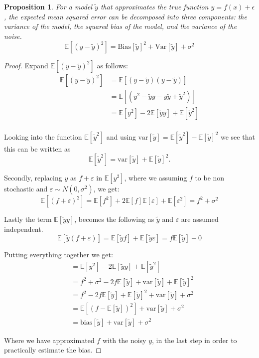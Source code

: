 \documentclass[twocolumn,aps]{revtex4}
\newtheorem{prop}{Proposition}[section]
\begin{document}
\begin{prop}
For a model $\tilde{y}$ that approximates the true function $y=f(x)+\epsilon$, the expected mean squared error can be decomposed into three components: the variance of the model, the squared bias of the model, and the variance of the noise.
$$\mathbb{E}[(y-\tilde{y})^2]=\mathrm{Bias}[\tilde{y}]^2+\mathrm{Var}[\tilde{y}]+\sigma^2$$
\label{prop:BiasVarianceDecomp}
\end{prop}

\begin{proof}

Expand $\mathbb{E}[(y-\tilde{y})^2]$ as follows:
\begin{align*}
\mathbb{E}[(y-\tilde{y})^2 ]&= \mathbb{E}[(y-\tilde{y}) (y-\tilde{y}) ] \\
&= \mathbb{E}[(y^2-\tilde{y} y -y \tilde{y} +\tilde{y}^2)] \\
&= \mathbb{E}[y^2] - 2 \mathbb{E}[\tilde{y} y] +\mathbb{E}[\tilde{y}^2] \\
\end{align*}

Looking into the function $\mathbb{E}[\tilde{y}^2]$ and using $\mathrm{var}[\tilde{y}] = \mathbb{E}[\tilde{y}^2] - \mathbb{E}[\tilde{y}]^2$ we see that this can be written as
$$
\mathbb{E}[\tilde{y}^2] = \mathrm{var}[\tilde{y}] + \mathbb{E}[\tilde{y}]^2.
$$

Secondly, replacing $y$ as $f + \varepsilon$ in $\mathbb{E}[y^2]$, where we assuming $f$ to be non stochastic and $\varepsilon \sim N(0, \sigma^2)$, we get:
$$
\mathbb{E}[(f+\varepsilon)^2] = \mathbb{E}[f^2] + 2 \mathbb{E}[f]\mathbb{E}[\varepsilon] + \mathbb{E}[\varepsilon^2] =  f^2 + \sigma^2
$$

Lastly the term $\mathbb{E}[\tilde{y} y]$, becomes the following as $\tilde{y}$ and $\varepsilon$ are assumed independent.
$$
\mathbb{E}[\tilde{y} (f + \varepsilon)] = \mathbb{E}[\tilde{y} f] + \mathbb{E}[\tilde{y} \varepsilon] = f \mathbb{E}[\tilde{y}] + 0
$$

Putting everything together we get:
\begin{align*}
&=\mathbb{E}[y^2] - 2 \mathbb{E}[\tilde{y} y] +\mathbb{E}[\tilde{y}^2] \\
&= f^2 + \sigma^2 - 2 f \mathbb{E}[\tilde{y}] +\mathrm{var}[\tilde{y}] + \mathbb{E}[\tilde{y}]^2 \\
&= f^2 - 2 f \mathbb{E}[\tilde{y}] + \mathbb{E}[\tilde{y}]^2 + \mathrm{var}[\tilde{y}] + \sigma^2 \\
&= \mathbb{E}[ (f - \mathbb{E}[\tilde{y}])^2] + \mathrm{var}[\tilde{y}] + \sigma^2 \\
&= \mathrm{bias}[\tilde{y}]  + \mathrm{var}[\tilde{y}] + \sigma^2 \
\end{align*}

Where we have approximated $f$ with the noisy $y$, in the last step in order to practically estimate the bias.
\end{proof}
\end{document}
